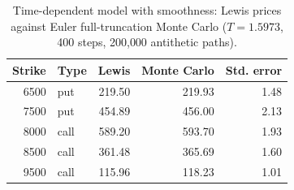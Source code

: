 \documentclass[11pt,a4paper]{article}
\theoremstyle{plain}
\theoremstyle{definition}
\begin{document}
\begin{table}[htbp]
\centering
\small
\begin{tabular}{@{}rlrrr@{}}
\toprule
Strike & Type & Lewis & Monte Carlo & Std. error \\
\midrule
6500 & put  & 219.50 & 219.93 & 1.48 \\
7500 & put  & 454.89 & 456.00 & 2.13 \\
8000 & call & 589.20 & 593.70 & 1.93 \\
8500 & call & 361.48 & 365.69 & 1.60 \\
9500 & call & 115.96 & 118.23 & 1.01 \\
\bottomrule
\end{tabular}
\caption{Time-dependent model with smoothness: Lewis prices against Euler full-truncation Monte Carlo ($T=1.5973$, 400 steps, 200{,}000 antithetic paths).}
\label{tab:td_mc}
\end{table}
\end{document}
